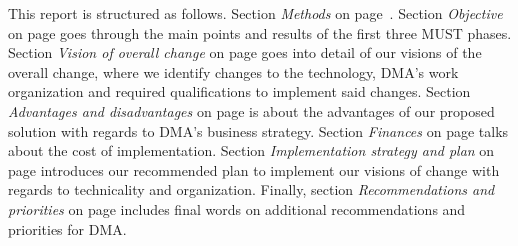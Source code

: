 This report is structured as follows. Section \textit{Methods} on page~\pageref{sec:method}. Section \textit{Objective} on page \pageref{sec:objective} goes through the main points and results of the first three MUST phases. Section \textit{Vision of overall change} on page \pageref{sect:vision} goes into detail of our visions of the overall change, where we identify changes to the technology, DMA’s work organization and required qualifications to implement said changes. Section \textit{Advantages and disadvantages} on page \pageref{sec:advantages} is about the advantages of our proposed solution with regards to DMA’s business strategy. Section \textit{Finances} on page \pageref{sec:finances} talks about the cost of implementation. Section \textit{Implementation strategy and plan} on page \pageref{sec:implementation} introduces our recommended plan to implement our visions of change with regards to technicality and organization. Finally, section \textit{Recommendations and priorities} on page \pageref{sec:recommendations} includes final words on additional recommendations and priorities for DMA.

